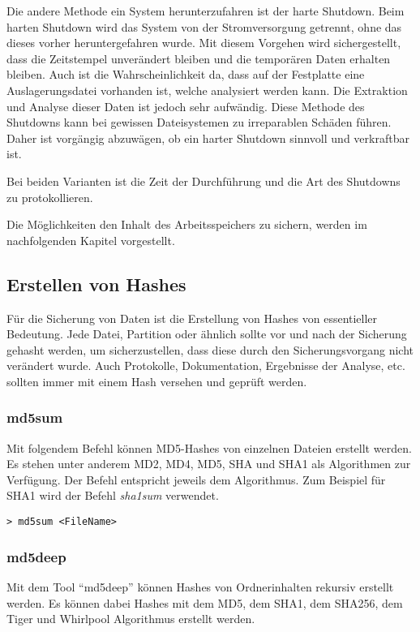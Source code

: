 Die andere Methode ein System herunterzufahren ist der harte Shutdown. Beim harten Shutdown wird das System von der Stromversorgung getrennt, ohne das dieses vorher heruntergefahren wurde. Mit diesem Vorgehen wird sichergestellt, dass die Zeitstempel unverändert bleiben und die temporären Daten erhalten bleiben. Auch ist die Wahrscheinlichkeit da, dass auf der Festplatte eine Auslagerungsdatei vorhanden ist, welche analysiert werden kann. Die Extraktion und Analyse dieser Daten ist jedoch sehr aufwändig. Diese Methode des Shutdowns kann bei gewissen Dateisystemen zu irreparablen Schäden führen. Daher ist vorgängig abzuwägen, ob ein harter Shutdown sinnvoll und verkraftbar ist.

Bei beiden Varianten ist die Zeit der Durchführung und die Art des Shutdowns zu protokollieren.

Die Möglichkeiten den Inhalt des Arbeitsspeichers zu sichern, werden im nachfolgenden Kapitel vorgestellt.



\subsection{Erstellen von Hashes} \label{subsec:ToolsTechniques:Secure:Hash}
Für die Sicherung von Daten ist die Erstellung von Hashes von essentieller Bedeutung. Jede Datei, Partition oder ähnlich sollte vor und nach der Sicherung gehasht werden, um sicherzustellen, dass diese durch den Sicherungsvorgang nicht verändert wurde. Auch Protokolle, Dokumentation, Ergebnisse der Analyse, etc. sollten immer mit einem Hash versehen und geprüft werden.

\subsubsection{md5sum}
Mit folgendem Befehl können MD5-Hashes von einzelnen Dateien erstellt werden. Es stehen unter anderem MD2, MD4, MD5, SHA und SHA1 als Algorithmen zur Verfügung. Der Befehl entspricht jeweils dem Algorithmus. Zum Beispiel für SHA1 wird der Befehl \textit{sha1sum} verwendet.

\begin{lstlisting}
> md5sum <FileName>
\end{lstlisting}

\subsubsection{md5deep}
Mit dem Tool "`md5deep"' können Hashes von Ordnerinhalten rekursiv erstellt werden. Es können dabei Hashes mit dem MD5, dem SHA1, dem SHA256, dem Tiger und Whirlpool Algorithmus erstellt werden.

